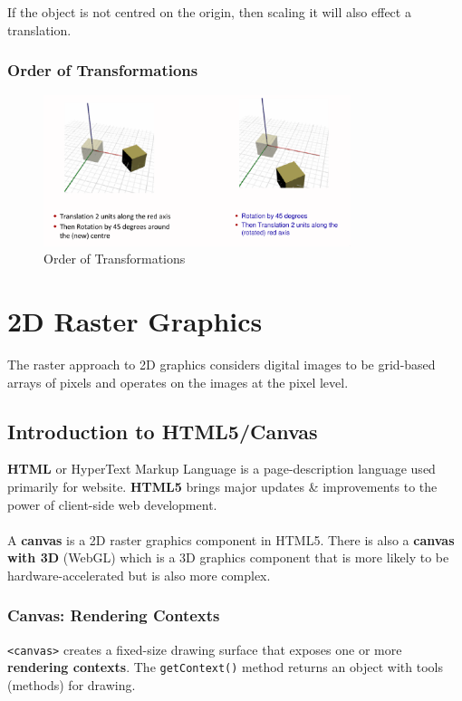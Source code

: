 \documentclass[a4paper,11pt]{article}
\begin{document}
If the object is not centred on the origin, then scaling it will also effect a translation.

\subsubsection{Order of Transformations}
\begin{figure}[H]
    \centering
    \includegraphics[width=0.8\textwidth]{images/order_of_transformations.png}
    \caption{Order of Transformations}
\end{figure}

\section{2D Raster Graphics}
The raster approach to 2D graphics considers digital images to be grid-based arrays of pixels and operates on the 
images at the pixel level.

\subsection{Introduction to HTML5/Canvas}
\textbf{HTML} or HyperText Markup Language is a page-description language used primarily for website.
\textbf{HTML5} brings major updates \& improvements to the power of client-side web development.
\\\\
A \textbf{canvas} is a 2D raster graphics component in HTML5.
There is also a \textbf{canvas with 3D} (WebGL) which is a 3D graphics component that is more likely to be 
hardware-accelerated but is also more complex.

\subsubsection{Canvas: Rendering Contexts}
\texttt{<canvas>} creates a fixed-size drawing surface that exposes one or more \textbf{rendering contexts}.
The \texttt{getContext()} method returns an object with tools (methods) for drawing.
\end{document}
